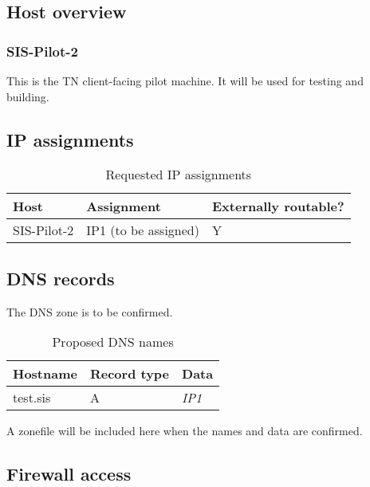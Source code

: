 \documentclass[10pt,a4paper]{article}
\begin{document}
\subsection{Host overview}

\subsubsection{SIS-Pilot-2}

This is the TN client-facing pilot machine.
It will be used for testing and building.

\subsection{IP assignments}

\begin{table}[h!]
    \caption{Requested IP assignments}
    \begin{tabular}{l l l}
        Host & Assignment & Externally routable? \\
        \hline
        SIS-Pilot-2 & IP1 (to be assigned) & Y \\
    \end{tabular}
\end{table}


\subsection{DNS records}

The DNS zone is to be confirmed.

\begin{table}[h!]
    \caption{Proposed DNS names}
    \begin{tabular}{l l l}
        Hostname & Record type & Data \\
        \hline
        test.sis & A & \emph{IP1} \\
    \end{tabular}
\end{table}

A zonefile will be included here when the names and data are confirmed.

\subsection{Firewall access}

\end{document}
